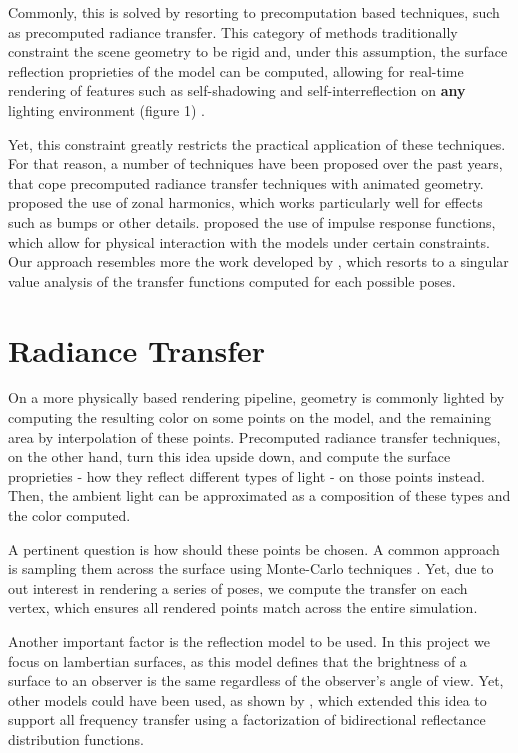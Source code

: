\documentclass[annual]{acmsiggraph}
\begin{document}
Commonly, this is solved by resorting to precomputation based techniques, such as precomputed radiance transfer. This category of methods traditionally constraint the scene geometry to be rigid and, under this assumption, the surface reflection proprieties of the model can be computed, allowing for real-time rendering of features such as self-shadowing and self-interreflection on \textbf{any} lighting environment (figure 1) .

Yet, this constraint greatly restricts the practical application of these techniques. For that reason, a number of techniques have been proposed over the past years, that cope precomputed radiance transfer techniques with animated geometry. \cite{zonal} proposed the use of zonal harmonics, which works particularly well for effects such as bumps or other details. \cite{impulses} proposed the use of impulse response functions, which allow for physical interaction with the models under certain constraints. Our approach resembles more the work developed by \cite{deformable}, which resorts to a singular value analysis of the transfer functions computed for each possible poses. 

\section{Radiance Transfer}

On a more physically based rendering pipeline, geometry is commonly lighted by computing the resulting color on some points on the model, and the remaining area by interpolation of these points. Precomputed radiance transfer techniques, on the other hand, turn this idea upside down, and compute the surface proprieties - how they reflect different types of light - on those points instead. Then, the ambient light can be approximated as a composition of these types and the color computed.

A pertinent question is how should these points be chosen. A common approach is sampling them across the surface using Monte-Carlo techniques . Yet, due to out interest in rendering a series of poses, we compute the transfer on each vertex, which ensures all rendered points match across the entire simulation.

Another important factor is the reflection model to be used. In this project we focus on lambertian surfaces, as this model defines that the brightness of a surface to an observer is the same regardless of the observer's angle of view. Yet, other models could have been used, as shown by \cite{glossy}, which extended this idea to support all frequency transfer using a factorization of bidirectional reflectance distribution functions.
\end{document}
